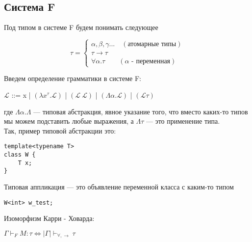  	\subsection{Система F}
 	
\begin{definition}
	 	Под типом в системе F будем понимать следующее

 	
 	\begin{equation*}
 	\tau =
 	\begin{cases}
 	\alpha,\beta,\gamma ...\quad(\text{атомарные типы}) \\
 	\tau\rightarrow\tau \\
 	\forall\alpha.\tau\qquad(\alpha\text{ - переменная})
 	\end{cases}
 	\end{equation*}
 \end{definition}

 \begin{definition}
 		Введем определение грамматики в системе F:
 	\begin{center}
		$\mathcal{L}$ ::= x | $\left(\lambda x^{\tau}.\mathcal{L}\right)$ | $\left(\mathcal{L}\ \mathcal{L}\right)$ | $\left(\Lambda\alpha.\mathcal{L}\right)$ | $\left(\mathcal{L}\tau\right)$
 	\end{center}
 \end{definition}
 	
	где $\Lambda\alpha.\Lambda$ --- типовая абстракция, явное указание того, что вместо каких-то типов мы можем подставить любые выражения, а $\Lambda\tau$ --- это применение типа. \\
 	
 	
 	Так, пример типовой абстракции это: 
    \begin{verbatim}
template<typename T>
class W {
    T x;
}
    \end{verbatim}
 	
	Типовая аппликация --- это объявление переменной класса с каким-то типом
 	
    \begin{verbatim}
W<int> w_test;
    \end{verbatim}
 	
 	\begin{theorem}
 		Изоморфизм Карри - Ховарда:
    \begin{center}
 		$\Gamma\vdash_F M:\tau\Leftrightarrow |\Gamma|\vdash_{\forall, \rightarrow}\tau$ 
    \end{center}
 	
 	\end{theorem}
 	
